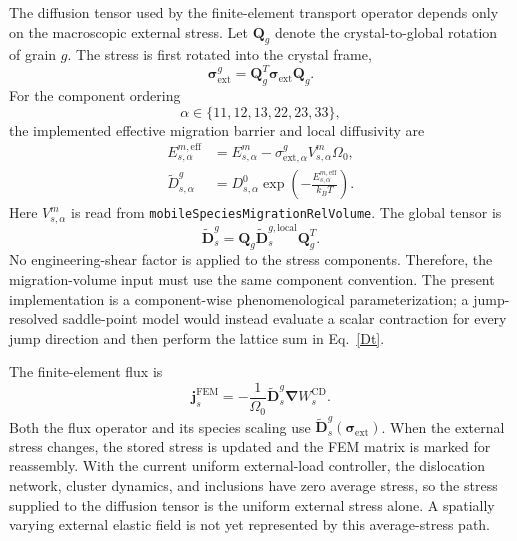 \documentclass[10pt]{article}
\begin{document}
The diffusion tensor used by the finite-element transport operator depends
only on the macroscopic external stress.  Let
$\boldsymbol{Q}_g$ denote the crystal-to-global rotation of grain $g$.  The
stress is first rotated into the crystal frame,
\begin{equation}
    \boldsymbol{\sigma}^{g}_{\mathrm{ext}}
    =
    \boldsymbol{Q}_g^T
    \boldsymbol{\sigma}_{\mathrm{ext}}
    \boldsymbol{Q}_g.
    \label{eq:external_stress_local}
\end{equation}
For the component ordering
\begin{equation}
    \alpha\in\{11,12,13,22,23,33\},
\end{equation}
the implemented effective migration barrier and local diffusivity are
\begin{align}
    E^{m,\mathrm{eff}}_{s,\alpha}
    &=
    E^m_{s,\alpha}
    -
    \sigma^{g}_{\mathrm{ext},\alpha}
    V^{m}_{s,\alpha}\Omega_0,
    \label{eq:implemented_migration_barrier}
    \\
    \widetilde{D}^{g}_{s,\alpha}
    &=
    D^0_{s,\alpha}
    \exp\left(
    -\frac{E^{m,\mathrm{eff}}_{s,\alpha}}{k_BT}
    \right).
    \label{eq:implemented_local_diffusivity}
\end{align}
Here $V^m_{s,\alpha}$ is read from
\texttt{mobileSpeciesMigrationRelVolume}.  The global tensor is
\begin{equation}
    \widetilde{\boldsymbol{D}}^g_s
    =
    \boldsymbol{Q}_g
    \widetilde{\boldsymbol{D}}^{g,\mathrm{local}}_s
    \boldsymbol{Q}_g^T.
    \label{eq:implemented_global_diffusivity}
\end{equation}
No engineering-shear factor is applied to the stress components.  Therefore,
the migration-volume input must use the same component convention.  The
present implementation is a component-wise phenomenological
parameterization; a jump-resolved saddle-point model would instead evaluate a
scalar contraction for every jump direction and then perform the lattice sum
in Eq.~\eqref{Dt}.

The finite-element flux is
\begin{equation}
    \boldsymbol{j}_s^{\mathrm{FEM}}
    =
    -\frac{1}{\Omega_0}
    \widetilde{\boldsymbol{D}}^g_s
    \boldsymbol{\nabla}W_s^{\mathrm{CD}}.
    \label{eq:implemented_flux}
\end{equation}
Both the flux operator and its species scaling use
$\widetilde{\boldsymbol{D}}^g_s(\boldsymbol{\sigma}_{\mathrm{ext}})$.
When the external stress changes, the stored stress is updated and the FEM
matrix is marked for reassembly.  With the current uniform external-load
controller, the dislocation network, cluster dynamics, and inclusions have
zero average stress, so the stress supplied to the diffusion tensor is the
uniform external stress alone.  A spatially varying external elastic field is
not yet represented by this average-stress path.
\end{document}
